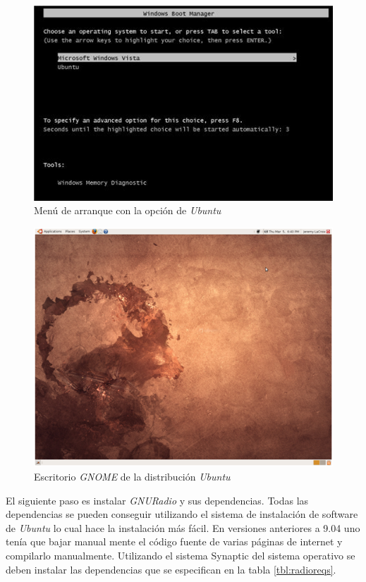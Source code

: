 \begin{figure}[htp]
\centering
	\includegraphics[scale=0.8]{figs/boot}
	\vspace{0.1in}
	\caption{Men\'u de arranque con la opci\'on de \emph{Ubuntu}}
	\label{fig:bootmenu}
\end{figure}

\begin{figure}[htp]
\centering
	\includegraphics[scale=0.7]{figs/desk}
	\vspace{0.1in}
	\caption{Escritorio \emph{GNOME} de la distribuci\'on \emph{Ubuntu}}
	\label{fig:desktop}
\end{figure}

El siguiente paso es instalar \emph{GNURadio} y sus dependencias. Todas
las dependencias se pueden conseguir utilizando el sistema de instalaci\'on de
software de \emph{Ubuntu} lo cual hace la instalaci\'on m\'as f\'acil. En
versiones anteriores a 9.04 uno ten\'ia que bajar manual mente el c\'odigo
fuente de varias p\'aginas de internet y compilarlo manualmente. Utilizando el
sistema Synaptic del sistema operativo se deben instalar las dependencias que se
especifican en la tabla \ref{tbl:radioreqs}.


